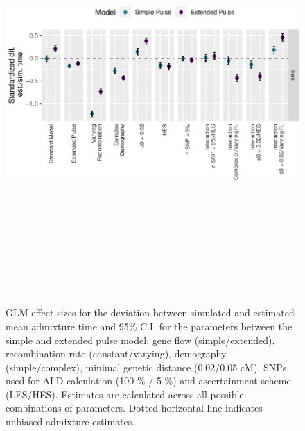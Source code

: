 \documentclass[11pt]{article}
\begin{document}
\begin{figure}
\centering
\includegraphics[width=12cm,height=16cm,keepaspectratio]{ATE_Revisions_files/figure-latex/figResult_3_GLM_SP_and_EP_bias-1.pdf}
\caption{\label{fig:figGLM_deviation} GLM effect sizes for the deviation between simulated and estimated mean admixture time  and 95\% C.I. for the parameters between the simple and extended pulse model: gene flow (simple/extended), recombination rate (constant/varying), demography (simple/complex), minimal genetic distance (0.02/0.05 cM), SNPs used for ALD calculation (100 \% / 5 \%) and ascertainment scheme (LES/HES). Estimates are calculated across all possible combinations of parameters. Dotted horizontal line indicates unbiased admixture estimates.}
\end{figure}
\end{document}
